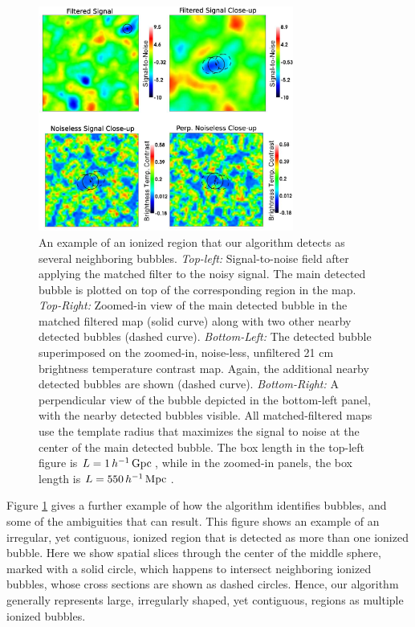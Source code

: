 \begin{figure}[h]
  \centering
  \includegraphics[width=8.4cm]{f8.eps}  
  \caption{An example of an ionized region that our algorithm detects as
several neighboring bubbles. \textit{Top-left:} Signal-to-noise field
    after applying the matched filter to the noisy signal. The
    main detected bubble is plotted on top of the corresponding region
    in the map. \textit{Top-Right:} Zoomed-in view of the main
    detected bubble in the matched filtered map (solid curve) along
    with two other nearby detected bubbles (dashed
    curve). \textit{Bottom-Left:} The detected bubble superimposed on the
    zoomed-in, noise-less, unfiltered 21 cm brightness temperature
    contrast map. Again, the additional nearby detected bubbles are
    shown (dashed curve). \textit{Bottom-Right:} A perpendicular view
    of the bubble depicted in the bottom-left panel, with the nearby
    detected bubbles visible. All matched-filtered maps use the
    template radius that maximizes the signal to noise at the center
    of the main detected bubble. The box length in the top-left figure
    is $L = 1\,h^{-1}\,{\rm Gpc}\,$, while in the zoomed-in panels, the box length
    is $L = 550 \,h^{-1}\,{\rm Mpc}\,$.}
  \label{fig:ShowBubbles}
\end{figure}

Figure \ref{fig:ShowBubbles} gives a further example of how the algorithm identifies
bubbles, and some of the ambiguities that can result. This figure
shows an example of an irregular, yet contiguous, ionized region that is
detected as more than one ionized bubble.
Here we show spatial slices through the
center of the middle sphere, marked with a solid circle, which happens to intersect
neighboring ionized bubbles, whose cross sections are shown as dashed circles.
Hence, our algorithm generally represents large, irregularly shaped, yet contiguous,
regions as multiple ionized bubbles.

